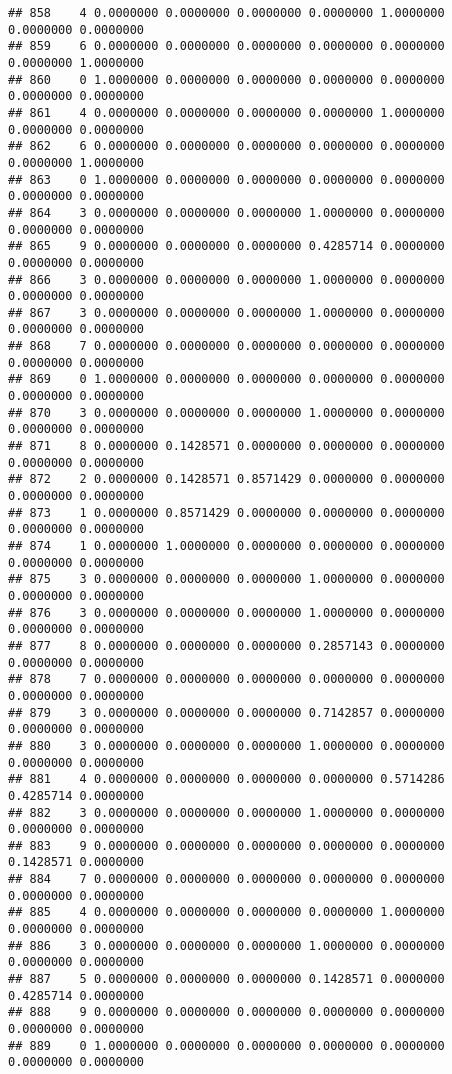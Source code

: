 \documentclass[
]{article}
\begin{document}
\begin{verbatim}
## 858    4 0.0000000 0.0000000 0.0000000 0.0000000 1.0000000 0.0000000 0.0000000
## 859    6 0.0000000 0.0000000 0.0000000 0.0000000 0.0000000 0.0000000 1.0000000
## 860    0 1.0000000 0.0000000 0.0000000 0.0000000 0.0000000 0.0000000 0.0000000
## 861    4 0.0000000 0.0000000 0.0000000 0.0000000 1.0000000 0.0000000 0.0000000
## 862    6 0.0000000 0.0000000 0.0000000 0.0000000 0.0000000 0.0000000 1.0000000
## 863    0 1.0000000 0.0000000 0.0000000 0.0000000 0.0000000 0.0000000 0.0000000
## 864    3 0.0000000 0.0000000 0.0000000 1.0000000 0.0000000 0.0000000 0.0000000
## 865    9 0.0000000 0.0000000 0.0000000 0.4285714 0.0000000 0.0000000 0.0000000
## 866    3 0.0000000 0.0000000 0.0000000 1.0000000 0.0000000 0.0000000 0.0000000
## 867    3 0.0000000 0.0000000 0.0000000 1.0000000 0.0000000 0.0000000 0.0000000
## 868    7 0.0000000 0.0000000 0.0000000 0.0000000 0.0000000 0.0000000 0.0000000
## 869    0 1.0000000 0.0000000 0.0000000 0.0000000 0.0000000 0.0000000 0.0000000
## 870    3 0.0000000 0.0000000 0.0000000 1.0000000 0.0000000 0.0000000 0.0000000
## 871    8 0.0000000 0.1428571 0.0000000 0.0000000 0.0000000 0.0000000 0.0000000
## 872    2 0.0000000 0.1428571 0.8571429 0.0000000 0.0000000 0.0000000 0.0000000
## 873    1 0.0000000 0.8571429 0.0000000 0.0000000 0.0000000 0.0000000 0.0000000
## 874    1 0.0000000 1.0000000 0.0000000 0.0000000 0.0000000 0.0000000 0.0000000
## 875    3 0.0000000 0.0000000 0.0000000 1.0000000 0.0000000 0.0000000 0.0000000
## 876    3 0.0000000 0.0000000 0.0000000 1.0000000 0.0000000 0.0000000 0.0000000
## 877    8 0.0000000 0.0000000 0.0000000 0.2857143 0.0000000 0.0000000 0.0000000
## 878    7 0.0000000 0.0000000 0.0000000 0.0000000 0.0000000 0.0000000 0.0000000
## 879    3 0.0000000 0.0000000 0.0000000 0.7142857 0.0000000 0.0000000 0.0000000
## 880    3 0.0000000 0.0000000 0.0000000 1.0000000 0.0000000 0.0000000 0.0000000
## 881    4 0.0000000 0.0000000 0.0000000 0.0000000 0.5714286 0.4285714 0.0000000
## 882    3 0.0000000 0.0000000 0.0000000 1.0000000 0.0000000 0.0000000 0.0000000
## 883    9 0.0000000 0.0000000 0.0000000 0.0000000 0.0000000 0.1428571 0.0000000
## 884    7 0.0000000 0.0000000 0.0000000 0.0000000 0.0000000 0.0000000 0.0000000
## 885    4 0.0000000 0.0000000 0.0000000 0.0000000 1.0000000 0.0000000 0.0000000
## 886    3 0.0000000 0.0000000 0.0000000 1.0000000 0.0000000 0.0000000 0.0000000
## 887    5 0.0000000 0.0000000 0.0000000 0.1428571 0.0000000 0.4285714 0.0000000
## 888    9 0.0000000 0.0000000 0.0000000 0.0000000 0.0000000 0.0000000 0.0000000
## 889    0 1.0000000 0.0000000 0.0000000 0.0000000 0.0000000 0.0000000 0.0000000

\end{verbatim}
\end{document}
